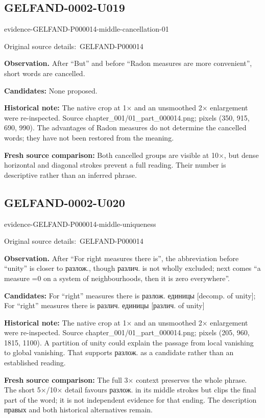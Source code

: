 \documentclass[11pt]{article}
\newcommand{\EvidenceBlock}[4]{%
 \par\smallskip\noindent\begin{minipage}{\linewidth}
 \begin{minipage}[t]{.47\linewidth}\vspace{0pt}\centering
 \csname evidence-#1-#2\endcsname\par
 {\scriptsize\SourceCropCaption\ #1}\par
 \end{minipage}\hfill
 \begin{minipage}[t]{.49\linewidth}\vspace{0pt}\raggedright
 {\small\color{orange!65!black}\textbf{#4} #3}\par
 \end{minipage}
 \end{minipage}\par\smallskip}
\newcommand{\SourceCropCaption}{Original source details:}\newcommand{\ReadingCaption}{Uncertain reading.}\newcommand{\IncompleteCaption}{Undeciphered passage.}\newcommand{\DiagramCaption}{Diagram and typed description.}
\begin{document}
\subsection*{GELFAND-0002-U019}
\EvidenceBlock{GELFAND-P000014}{middle-cancellation-01}{After “But” and before “Radon measures are more convenient”, short words are cancelled.}{Observation.}
\par\smallskip\noindent\textbf{Candidates: } None proposed.\par
\par\smallskip\noindent\textbf{Historical note: } The native crop at 1× and an unsmoothed 2× enlargement were re-inspected. Source chapter\_001/01\_part\_000014.png; pixels (350, 915, 690, 990). The advantages of Radon measures do not determine the cancelled words; they have not been restored from the meaning.\par
\par\smallskip\noindent\textbf{Fresh source comparison: } Both cancelled groups are visible at 10×, but dense horizontal and diagonal strokes prevent a full reading. Their number is descriptive rather than an inferred phrase.\par

\subsection*{GELFAND-0002-U020}
\EvidenceBlock{GELFAND-P000014}{middle-uniqueness}{After “For right measures there is”, the abbreviation before “unity” is closer to разлож., though различ. is not wholly excluded; next comes “a measure =0 on a system of neighbourhoods, then it is zero everywhere”.}{Observation.}
\par\smallskip\noindent\textbf{Candidates: } For “right” measures there is разлож. единицы [decomp. of unity]; For “right” measures there is различ. единицы [различ. of unity]\par
\par\smallskip\noindent\textbf{Historical note: } The native crop at 1× and an unsmoothed 2× enlargement were re-inspected. Source chapter\_001/01\_part\_000014.png; pixels (205, 960, 1815, 1100). A partition of unity could explain the passage from local vanishing to global vanishing. That supports разлож. as a candidate rather than an established reading.\par
\par\smallskip\noindent\textbf{Fresh source comparison: } The full 3× context preserves the whole phrase. The short 5×/10× detail favours разлож. in its middle strokes but clips the final part of the word; it is not independent evidence for that ending. The description правых and both historical alternatives remain.\par
\end{document}
